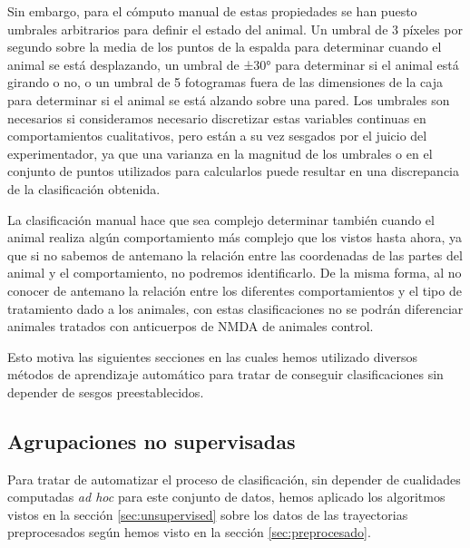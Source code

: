 Sin embargo, para el cómputo manual de estas propiedades se han puesto umbrales arbitrarios para definir el estado del animal. Un umbral de 3 píxeles por segundo sobre la media de los puntos de la espalda para determinar cuando el animal se está desplazando, un umbral de ±30° para determinar si el animal está girando o no, o un umbral de 5 fotogramas fuera de las dimensiones de la caja para determinar si el animal se está alzando sobre una pared. Los umbrales son necesarios si consideramos necesario discretizar estas variables continuas en comportamientos cualitativos, pero están a su vez sesgados por el juicio del experimentador, ya que una varianza en la magnitud de los umbrales o en el conjunto de puntos utilizados para calcularlos puede resultar en una discrepancia de la clasificación obtenida.

La clasificación manual hace que sea complejo determinar también cuando el animal realiza algún comportamiento más complejo que los vistos hasta ahora, ya que si no sabemos de antemano la relación entre las coordenadas de las partes del animal y el comportamiento, no podremos identificarlo. De la misma forma, al no conocer de antemano la relación entre los diferentes comportamientos y el tipo de tratamiento dado a los animales, con estas clasificaciones no se podrán diferenciar animales tratados con anticuerpos de NMDA de animales control.

Esto motiva las siguientes secciones en las cuales hemos utilizado diversos métodos de aprendizaje automático para tratar de conseguir clasificaciones sin depender de sesgos preestablecidos.

\subsection{Agrupaciones no supervisadas}
Para tratar de automatizar el proceso de clasificación, sin depender de cualidades computadas \textit{ad hoc} para este conjunto de datos, hemos aplicado los algoritmos vistos en la sección \ref{sec:unsupervised} sobre los datos de las trayectorias preprocesados según hemos visto en la sección \ref{sec:preprocesado}.


